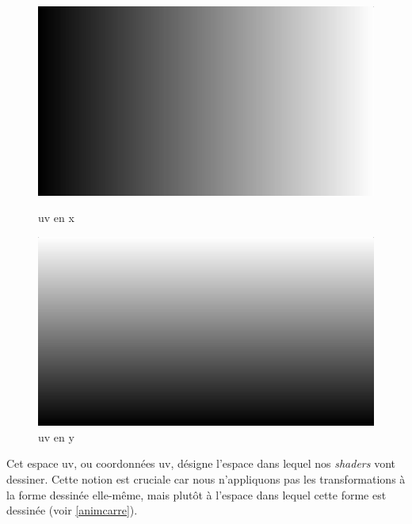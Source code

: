 \begin{figure}[h]
  \begin{minipage}[b]{0.45\linewidth}
    \centering
    \includegraphics[width=\linewidth]{images/meduse/meduse_uv_00.JPG}
    \caption{uv en x}
    \label{meduse_uv_00}
  \end{minipage}
  \hspace{0.1\linewidth} %
  \begin{minipage}[b]{0.45\linewidth}
    \centering
    \includegraphics[width=\linewidth]{images/meduse/meduse_uv_01.JPG}
    \caption{uv en y}
    \label{meduse_uv_01}
  \end{minipage}
\end{figure}


Cet espace uv, ou coordonnées uv, désigne l'espace dans lequel nos \textit{shaders} vont dessiner. Cette notion est cruciale car nous n'appliquons pas les transformations à la forme dessinée elle-même, mais plutôt à l'espace dans lequel cette forme est dessinée (voir \ref{animcarre}).




